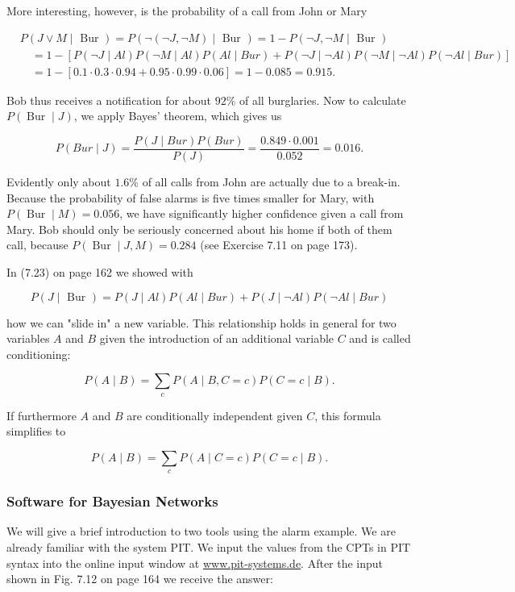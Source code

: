 \documentclass[10pt]{book}
\begin{document}
More interesting, however, is the probability of a call from John or Mary

$$
\begin{aligned}
& P(J \vee M \mid \text { Bur })=P(\neg(\neg J, \neg M) \mid \text { Bur })=1-P(\neg J, \neg M \mid \text { Bur }) \\
& \quad=1-[P(\neg J \mid A l) P(\neg M \mid A l) P(A l \mid B u r)+P(\neg J \mid \neg A l) P(\neg M \mid \neg A l) P(\neg A l \mid B u r)] \\
& \quad=1-[0.1 \cdot 0.3 \cdot 0.94+0.95 \cdot 0.99 \cdot 0.06]=1-0.085=0.915 .
\end{aligned}
$$

Bob thus receives a notification for about $92 \%$ of all burglaries. Now to calculate $P(\operatorname{Bur} \mid J)$, we apply Bayes' theorem, which gives us

$$
P(B u r \mid J)=\frac{P(J \mid B u r) P(B u r)}{P(J)}=\frac{0.849 \cdot 0.001}{0.052}=0.016 .
$$

Evidently only about $1.6 \%$ of all calls from John are actually due to a break-in. Because the probability of false alarms is five times smaller for Mary, with $P(\operatorname{Bur} \mid M)=0.056$, we have significantly higher confidence given a call from Mary. Bob should only be seriously concerned about his home if both of them call, because $P(\operatorname{Bur} \mid J, M)=0.284$ (see Exercise 7.11 on page 173).

In (7.23) on page 162 we showed with

$$
P(J \mid \text { Bur })=P(J \mid A l) P(A l \mid B u r)+P(J \mid \neg A l) P(\neg A l \mid B u r)
$$

how we can "slide in" a new variable. This relationship holds in general for two variables $A$ and $B$ given the introduction of an additional variable $C$ and is called conditioning:

$$
P(A \mid B)=\sum_{c} P(A \mid B, C=c) P(C=c \mid B) .
$$

If furthermore $A$ and $B$ are conditionally independent given $C$, this formula simplifies to

$$
P(A \mid B)=\sum_{c} P(A \mid C=c) P(C=c \mid B) .
$$

\subsubsection*{Software for Bayesian Networks}
We will give a brief introduction to two tools using the alarm example. We are already familiar with the system PIT. We input the values from the CPTs in PIT syntax into the online input window at \href{http://www.pit-systems.de}{www.pit-systems.de}. After the input shown in Fig. 7.12 on page 164 we receive the answer:
\end{document}
